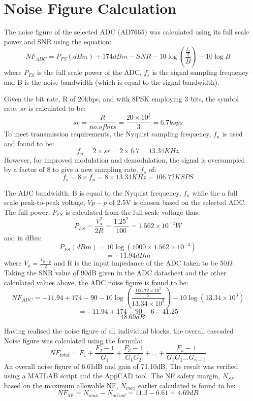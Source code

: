 
\section{Noise Figure Calculation}

The noise figure of the selected ADC (AD7665) was calculated using its full scale power and SNR using the equation:
	\[	NF_{ADC} = P_{FS}(dBm) + 174dBm - SNR - 10 \log \left( \frac{\frac{f_{s}}{2}}{B} \right) - 10 \log B  \]
	where \(P_{FS}\) is the full scale power of the ADC, \(f_{s}\) is the signal sampling frequency and B is the noise bandwidth (which is equal to the signal bandwidth).

Given the bit rate, R of 20kbps, and with 8PSK employing 3 bits, the symbol rate, \(sr\) is calculated to be:
	\[ sr = \frac{R}{no. of bits} = \frac{20 \times 10^{3}}{ 3 } = 6.7 ksps  \]
To meet transmission requirements, the Nyquist sampling frequency, \(f_{n}\) is used and found to be:
	\[ f_{n} = 2 \times sr = 2 \times 6.7 = 13.34 KHz\]
However, for improved modulation and demodulation, the signal is oversampled by a factor of 8 to give a new sampling rate, \(f_{s}\) of:
	\[ f_{s} = 8 \times f_{n} = 8 \times 13.34KHz = 106.72KSPS\]

The ADC bandwidth, B is equal to the Nyquist frequency, \(f_{n}\) while the a full scale peak-to-peak voltage, \(V{p-p}\) of 2.5V is chosen based on the selected ADC.  The full power, \(P_{FS}\) is calculated from the full scale voltage thus:
	\[ P_{FS} = \frac{V^{2}_{o}}{2R} = \frac{1.25^2}{100} = 1.562 \times 10^{-2} W \]
and in dBm:
	\[ P_{FS}(dBm) = 10 \log \left( 1000 \times 1.562 \times 10^{-4} \right) \]
	\[ 			   = -11.94dBm	\]
where \(V_{o} = \frac{V_{p-p}}{2}\) and R is the input impedance of the ADC taken to be \(50\Omega\).
Taking the SNR value of 90dB given in the ADC datasheet and the other calculated values above, the ADC noise figure is found to be:
	\[ NF_{ADC} = -11.94 + 174 - 90 - 10 \log \left( \frac{\frac{106.72 \times 10^{3}}{2}}{13.34 \times 10^{3}} \right) - 10 \log (13.34 \times 10^{3}) \]
	\[ 		    = -11.94 + 174 - 90 - 6 - 41.25\]
	\[  		= 48.69dB \]
	
Having realised the noise figure of all individual blocks, the overall cascaded Noise figure was calculated using the formula:
	\[ NF_{total} = F_{1} + \frac{F_{2} - 1}{G_{1}} + \frac{F_{3} - 1}{G_{1}G_{2}} + ... +\frac{F_{n} - 1}{G_{1}G_{2}...G_{n-1}} \]
An overall noise figure of  6.61dB and gain of 71.10dB.  The result was verified using a MATLAB script and the AppCAD tool.  The NF safety margin, \(N_{SF}\) based on the maximum allowable NF, \(N_{max}\) earlier calculated is found to be:  
	\[ NF_{SF} = N_{max} - N_{actual} = 11.3 - 6.61 = 4.69dB	\]

